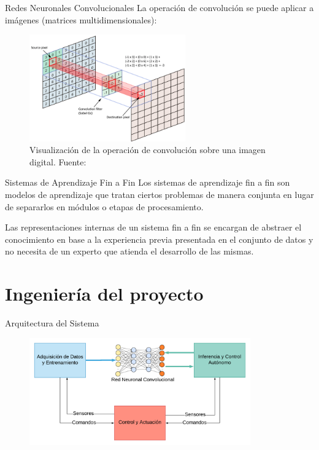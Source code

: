 \documentclass[10pt]{beamer}
\begin{document}
\begin{frame}{Redes Neuronales Convolucionales}
    La operación de convolución se puede aplicar a imágenes (matrices multidimensionales):

    \begin{figure}[!h] 
        \centering
        \includegraphics[width=0.60\textwidth]{../img/convolucion}
        \caption[Visualización de la operación de convolución sobre una imagen digital]{Visualización de la operación de convolución sobre una imagen digital. Fuente: \cite{cornelisse_2018} }
    \end{figure}
\end{frame}

\begin{frame}{Sistemas de Aprendizaje Fin a Fin}
    Los sistemas de aprendizaje fin a fin son modelos de aprendizaje que tratan ciertos problemas 
    de manera conjunta en lugar de separarlos en módulos o etapas de procesamiento.

    Las representaciones internas de un sistema fin a fin se encargan de abstraer el conocimiento en 
    base a la experiencia previa presentada en el conjunto de datos y no necesita de un experto que atienda 
    el desarrollo de las mismas.

\end{frame}

\section*{Ingeniería del proyecto}

\begin{frame}{Arquitectura del Sistema}
    \begin{figure}[!h] 
        \centering
        \includegraphics[width=0.85\textwidth]{../img/arquitectura}
        \end{figure}
\end{frame}
\end{document}
